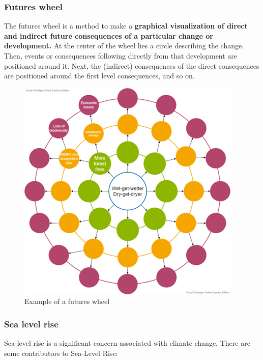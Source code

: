 \documentclass[../summary.tex]{subfiles}
\begin{document}
\subsubsection{Futures wheel}

The futures wheel is a method to make a \textbf{graphical visualization of direct and indirect future consequences of a particular change or development.} At the center of the wheel lies a circle describing the change. Then, events or consequences following directly from that development are positioned around it. Next, the (indirect) consequences of the direct consequences are positioned around the first level consequences, and so on.

\begin{figure}[H]
	\centering
	\includegraphics[width=0.45\linewidth]{../images/futures_wheel}
	\caption{Example of a futures wheel}
	\label{fig:futureswheel}
\end{figure}

\subsubsection{Sea level rise}

Sea-level rise is a significant concern associated with climate change. There are some contributors to Sea-Level Rise:
\end{document}
